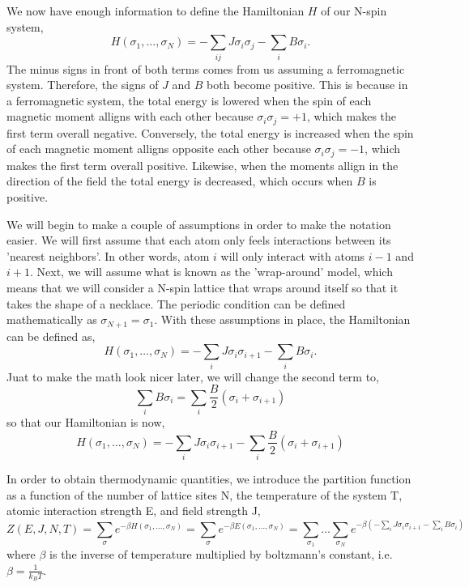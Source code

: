 \documentclass{article}
\newcommand{\be}{\begin{equation}}
\newcommand{\ee}{\end{equation}}
\begin{document}
We now have enough information to define the Hamiltonian $H$ of our N-spin system,
\be
  H(\sigma_1, \dots, \sigma_N) = - \sum_{ij} J \sigma_i \sigma_j - \sum_i B \sigma_i .
\ee
The minus signs in front of both terms comes from us assuming a ferromagnetic system.
Therefore, the signs of $J$ and $B$ both become positive.
This is because in a ferromagnetic system, the total energy is lowered when the spin of each magnetic moment alligns with each other because $\sigma_i \sigma_j = +1$, which makes the first term overall negative.
Conversely, the total energy is increased when the spin of each magnetic moment alligns opposite each other because $\sigma_i \sigma_j = -1$, which makes the first term overall positive.
Likewise, when the moments allign in the direction of the field the total energy is decreased, which occurs when $B$ is positive.

We will begin to make a couple of assumptions in order to make the notation easier.
We will first assume that each atom only feels interactions between its 'nearest neighbors'.
In other words, atom $i$ will only interact with atoms $i - 1$ and $i + 1$.
Next, we will assume what is known as the 'wrap-around' model, which means that we will consider a N-spin lattice that wraps around itself so that it takes the shape of a necklace.
The periodic condition can be defined mathematically as $\sigma_{N+1} = \sigma_1$.
With these assumptions in place, the Hamiltonian can be defined as,
\be
  H(\sigma_1, \dots, \sigma_N) = - \sum_{i} J \sigma_i \sigma_{i+1} - \sum_i B \sigma_i .
\ee
Juat to make the math look nicer later, we will change the second term to,
\be
  \sum_i B \sigma_i = \sum_i \frac{B}{2} (\sigma_i + \sigma_{i+1})
\ee
so that our Hamiltonian is now,
\be \label{eq:1d_hamil}
  H(\sigma_1, \dots, \sigma_N) = - \sum_{i} J \sigma_i \sigma_{i+1} - \sum_i \frac{B}{2} (\sigma_i + \sigma_{i+1})
\ee

In order to obtain thermodynamic quantities, we introduce the partition function as a function of the number of lattice sites N, the temperature of the system T, atomic interaction strength E, and field strength J,
\be \label{eq:partition}
  Z(E, J, N, T) = \sum_{{\sigma}} e^{- \beta H(\sigma_1, \dots, \sigma_N)} = \sum_{{\sigma}} e^{- \beta E(\sigma_1, \dots, \sigma_N)} = \sum_{\sigma_1} \dots \sum_{\sigma_N} e^{- \beta( - \sum_{i} J \sigma_i \sigma_{i+1} - \sum_i B \sigma_i)}
\ee
where $\beta$ is the inverse of temperature multiplied by boltzmann's constant, i.e. $\beta = \frac{1}{k_B T}$.
\end{document}
